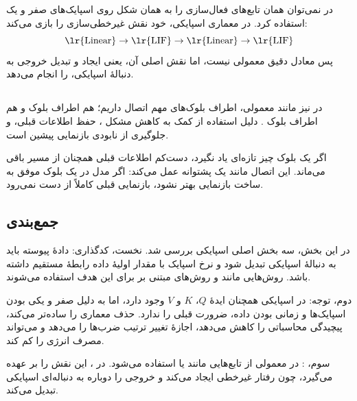 در  نمی‌توان همان تابع‌های فعال‌سازی را به همان شکل روی اسپایک‌های صفر و یک استفاده کرد. در معماری اسپایکی، خود  نقش غیرخطی‌سازی را بازی می‌کند:
\[
\text{\lr{Linear}} \rightarrow \text{\lr{LIF}} \rightarrow
\text{\lr{Linear}} \rightarrow \text{\lr{LIF}}
\]
پس  معادل دقیق  معمولی نیست، اما نقش اصلی آن، یعنی ایجاد  و تبدیل خروجی به دنبالهٔ اسپایکی، را انجام می‌دهد.

\subsection{}
در  نیز مانند  معمولی، اطراف بلوک‌های مهم اتصال  داریم؛ هم اطراف بلوک  و هم اطراف بلوک . دلیل استفاده از  کمک به کاهش مشکل ، حفظ اطلاعات قبلی، و جلوگیری از نابودی بازنمایی پیشین است.

اگر یک بلوک چیز تازه‌ای یاد نگیرد، دست‌کم اطلاعات قبلی همچنان از مسیر  باقی می‌ماند. این اتصال مانند یک پشتوانه عمل می‌کند: اگر مدل در یک بلوک موفق به ساخت بازنمایی بهتر نشود، بازنمایی قبلی کاملاً از دست نمی‌رود.

\subsection{جمع‌بندی }
در این بخش، سه بخش اصلی  اسپایکی بررسی شد. نخست، کدگذاری: دادهٔ پیوسته باید به دنبالهٔ اسپایکی تبدیل شود و نرخ اسپایک با مقدار اولیهٔ داده رابطهٔ مستقیم داشته باشد. روش‌هایی مانند  و روش‌های مبتنی بر  برای این هدف استفاده می‌شوند.

دوم، توجه: در  اسپایکی همچنان ایدهٔ \(Q\)، \(K\) و \(V\) وجود دارد، اما به دلیل صفر و یکی بودن اسپایک‌ها و زمانی بودن داده،  ضرورت قبلی را ندارد. حذف  معماری را ساده‌تر می‌کند، پیچیدگی محاسباتی را کاهش می‌دهد، اجازهٔ تغییر ترتیب ضرب‌ها را می‌دهد و می‌تواند مصرف انرژی را کم کند.


سوم، : در  معمولی از تابع‌هایی مانند  یا  استفاده می‌شود. در ،  این نقش را بر عهده می‌گیرد، چون رفتار غیرخطی ایجاد می‌کند و خروجی را دوباره به دنباله‌ای اسپایکی تبدیل می‌کند.

